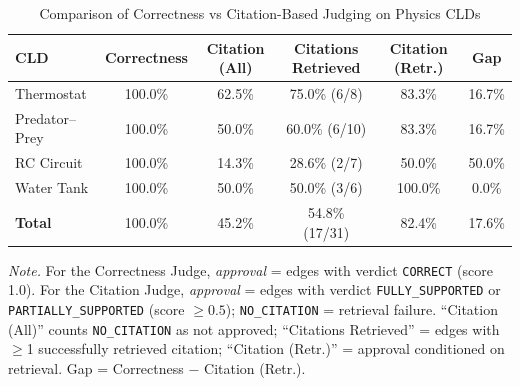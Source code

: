 \begin{table}[htbp]
\centering
\begin{threeparttable}
\caption{Comparison of Correctness vs Citation-Based Judging on Physics CLDs}
\label{tab:physics-comparison-enhanced}
\begin{tabular}{lccccc}
\toprule
\textbf{CLD} & \textbf{Correctness} & \textbf{Citation (All)} & \textbf{Citations Retrieved} & \textbf{Citation (Retr.)} & \textbf{Gap} \\
\midrule
Thermostat & 100.0\% & 62.5\% & 75.0\% (6/8) & 83.3\% & 16.7\% \\
Predator--Prey & 100.0\% & 50.0\% & 60.0\% (6/10) & 83.3\% & 16.7\% \\
RC Circuit & 100.0\% & 14.3\% & 28.6\% (2/7) & 50.0\% & 50.0\% \\
Water Tank & 100.0\% & 50.0\% & 50.0\% (3/6) & 100.0\% & 0.0\% \\
\midrule
\textbf{Total} & 100.0\% & 45.2\% & 54.8\% (17/31) & 82.4\% & 17.6\% \\
\bottomrule
\end{tabular}
\begin{tablenotes}
\small
\item \textit{Note.} For the Correctness Judge, \emph{approval} = edges with verdict \texttt{CORRECT} (score 1.0). For the Citation Judge, \emph{approval} = edges with verdict \texttt{FULLY\_SUPPORTED} or \texttt{PARTIALLY\_SUPPORTED} (score $\ge 0.5$); \texttt{NO\_CITATION} = retrieval failure. ``Citation (All)'' counts \texttt{NO\_CITATION} as not approved; ``Citations Retrieved'' = edges with $\ge$1 successfully retrieved citation; ``Citation (Retr.)'' = approval conditioned on retrieval. Gap = Correctness $-$ Citation (Retr.).
\end{tablenotes}
\end{threeparttable}
\end{table}
